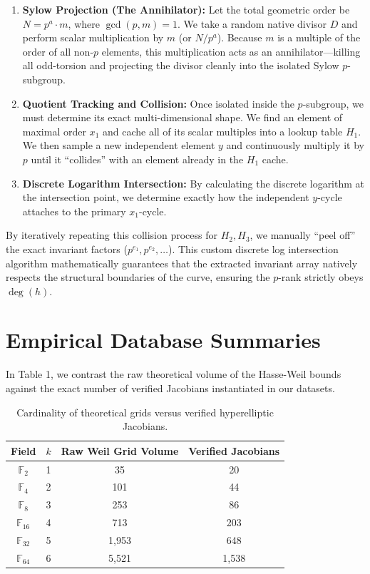 \documentclass[letterpaper, 11pt]{article}
\begin{document}
\begin{enumerate}
    \item \textbf{Sylow Projection (The Annihilator):} Let the total geometric order be $N = p^a \cdot m$, where $\gcd(p,m)=1$. We take a random native divisor $D$ and perform scalar multiplication by $m$ (or $N/p^a$). Because $m$ is a multiple of the order of all non-$p$ elements, this multiplication acts as an annihilator—killing all odd-torsion and projecting the divisor cleanly into the isolated Sylow $p$-subgroup.
    \item \textbf{Quotient Tracking and Collision:} Once isolated inside the $p$-subgroup, we must determine its exact multi-dimensional shape. We find an element of maximal order $x_1$ and cache all of its scalar multiples into a lookup table $H_1$. We then sample a new independent element $y$ and continuously multiply it by $p$ until it ``collides'' with an element already in the $H_1$ cache. 
    \item \textbf{Discrete Logarithm Intersection:} By calculating the discrete logarithm at the intersection point, we determine exactly how the independent $y$-cycle attaches to the primary $x_1$-cycle.
\end{enumerate}

By iteratively repeating this collision process for $H_2, H_3$, we manually ``peel off'' the exact invariant factors ($p^{e_1}, p^{e_2}, \dots$). This custom discrete log intersection algorithm mathematically guarantees that the extracted invariant array natively respects the structural boundaries of the curve, ensuring the $p$-rank strictly obeys $\deg(h)$.

\section{Empirical Database Summaries}
In Table 1, we contrast the raw theoretical volume of the Hasse-Weil bounds against the exact number of verified Jacobians instantiated in our datasets.

\begin{table}[h!]
\centering
\begin{tabular}{cccc}
\toprule
Field & $k$ & Raw Weil Grid Volume & Verified Jacobians \\
\midrule
$\mathbb{F}_2$ & 1 & 35 & 20 \\
$\mathbb{F}_4$ & 2 & 101 & 44 \\
$\mathbb{F}_8$ & 3 & 253 & 86 \\
$\mathbb{F}_{16}$ & 4 & 713 & 203 \\
$\mathbb{F}_{32}$ & 5 & 1,953 & 648 \\
$\mathbb{F}_{64}$ & 6 & 5,521 & 1,538 \\
\bottomrule
\end{tabular}
\caption{Cardinality of theoretical grids versus verified hyperelliptic Jacobians.}
\end{table}
\end{document}
